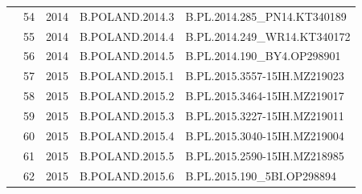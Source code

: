 \begin{table}[htbp]
\begin{tabular}{|cllll|}
\multicolumn{1}{|c|}{}                                  & \multicolumn{1}{l|}{54}          & \multicolumn{1}{l|}{2014}          & \multicolumn{1}{l|}{B.POLAND.2014.3}    & B.PL.2014.285\_PN14.KT340189    \\ \cline{2-5} 
\multicolumn{1}{|c|}{}                                  & \multicolumn{1}{l|}{55}          & \multicolumn{1}{l|}{2014}          & \multicolumn{1}{l|}{B.POLAND.2014.4}    & B.PL.2014.249\_WR14.KT340172    \\ \cline{2-5} 
\multicolumn{1}{|c|}{}                                  & \multicolumn{1}{l|}{56}          & \multicolumn{1}{l|}{2014}          & \multicolumn{1}{l|}{B.POLAND.2014.5}    & B.PL.2014.190\_BY4.OP298901     \\ \cline{2-5} 
\multicolumn{1}{|c|}{}                                  & \multicolumn{1}{l|}{57}          & \multicolumn{1}{l|}{2015}          & \multicolumn{1}{l|}{B.POLAND.2015.1}    & B.PL.2015.3557-15IH.MZ219023    \\ \cline{2-5} 
\multicolumn{1}{|c|}{}                                  & \multicolumn{1}{l|}{58}          & \multicolumn{1}{l|}{2015}          & \multicolumn{1}{l|}{B.POLAND.2015.2}    & B.PL.2015.3464-15IH.MZ219017    \\ \cline{2-5} 
\multicolumn{1}{|c|}{}                                  & \multicolumn{1}{l|}{59}          & \multicolumn{1}{l|}{2015}          & \multicolumn{1}{l|}{B.POLAND.2015.3}    & B.PL.2015.3227-15IH.MZ219011    \\ \cline{2-5} 
\multicolumn{1}{|c|}{}                                  & \multicolumn{1}{l|}{60}          & \multicolumn{1}{l|}{2015}          & \multicolumn{1}{l|}{B.POLAND.2015.4}    & B.PL.2015.3040-15IH.MZ219004    \\ \cline{2-5} 
\multicolumn{1}{|c|}{}                                  & \multicolumn{1}{l|}{61}          & \multicolumn{1}{l|}{2015}          & \multicolumn{1}{l|}{B.POLAND.2015.5}    & B.PL.2015.2590-15IH.MZ218985    \\ \cline{2-5} 
\multicolumn{1}{|c|}{}                                  & \multicolumn{1}{l|}{62}          & \multicolumn{1}{l|}{2015}          & \multicolumn{1}{l|}{B.POLAND.2015.6}    & B.PL.2015.190\_5BI.OP298894     \\ \hline
\end{tabular}
\end{table}


